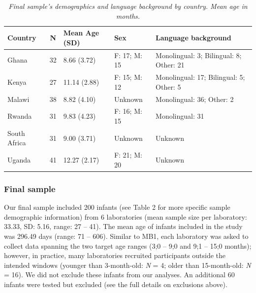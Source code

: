 \documentclass[
  ,man,floatsintext]{apa6}
\begin{document}
\begin{table}[!t]
\caption{\textit{Final sample's demographics and language background by country. Mean age in months.}}
\label{tab:country_demographics}
\centering
\begin{tabularx}{\textwidth}{lcllX}
\toprule
\textbf{Country} & \textbf{N} & \textbf{Mean Age (SD)} & \textbf{Sex} & \textbf{Language background} \\
\midrule
Ghana & 32 & 8.66 (3.72) & F: 17; M: 15 & Monolingual: 3; Bilingual: 8; Other: 21 \\
Kenya & 27 & 11.14 (2.88) & F: 15; M: 12 & Monolingual: 17; Bilingual: 5; Other: 5 \\
Malawi & 38 & 8.82 (4.10) & Unknown & Monolingual: 36; Other: 2 \\
Rwanda & 31 & 9.83 (4.23) & F: 16; M: 15 & Monolingual: 31\\
South Africa & 31 & 9.00 (3.71) & Unknown & Unknown \\
Uganda & 41 & 12.27 (2.17) & F: 21; M: 20 & Unknown \\
\bottomrule
\end{tabularx}
\end{table}

\hypertarget{final-sample}{%
\subsubsection{Final sample}\label{final-sample}}

Our final sample included 200 infants (see Table 2 for more specific sample demographic information) from 6 laboratories (mean sample size per laboratory: 33.33, SD: 5.16, range: 27 -- 41). The mean age of infants included in the study was 296.49 days (range: 71 -- 606). Similar to MB1, each laboratory was asked to collect data spanning the two target age ranges (3;0 -- 9;0 and 9;1 -- 15;0 months); however, in practice, many laboratories recruited participants outside the intended windows (younger than 3-month-old: \emph{N} = 4; older than 15-month-old: \emph{N} = 16). We did not exclude these infants from our analyses. An additional 60 infants were tested but excluded (see the full details on exclusions above).
\end{document}
